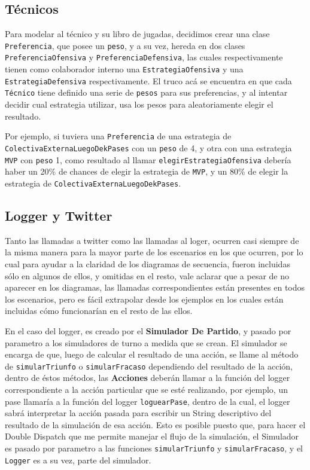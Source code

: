 \subsection{Técnicos}
Para modelar al técnico y su libro de jugadas, decidimos crear una clase \texttt{Preferencia}, que posee un \texttt{peso}, y a su vez, hereda en dos clases \texttt{PreferenciaOfensiva} y \texttt{PreferenciaDefensiva}, las cuales respectivamente tienen como colaborador interno una \texttt{EstrategiaOfensiva} y una \texttt{EstrategiaDefensiva} respectivamente. El truco acá se encuentra en que cada \texttt{Técnico} tiene definido una serie de \texttt{pesos} para sus preferencias, y al intentar decidir cual estrategia utilizar, usa los pesos para aleatoriamente elegir el resultado.

Por ejemplo, si tuviera una \texttt{Preferencia} de una estrategia de \texttt{ColectivaExternaLuegoDekPases} con un \texttt{peso} de 4, y  otra con una estrategia \texttt{MVP} con \texttt{peso} 1, como resultado al llamar \texttt{elegirEstrategiaOfensiva} debería haber un 20\% de chances de elegir la estrategia de \texttt{MVP}, y un 80\% de elegir la estrategia de \texttt{ColectivaExternaLuegoDekPases}.

\subsection{Logger y Twitter}
Tanto las llamadas a twitter como las llamadas al loger, ocurren casi siempre de la misma manera para la mayor parte de los escenarios en los que ocurren, por lo cual para ayudar a la claridad de los diagramas de secuencia, fueron incluidas sólo en algunos de ellos, y omitidas en el resto, vale aclarar que a pesar de no aparecer en los diagramas, las llamadas correspondientes están presentes en todos los escenarios, pero es fácil extrapolar desde los ejemplos en los cuales están incluidas cómo funcionarían en el resto de las ellos.

En el caso del logger, es creado por el \textbf{Simulador De Partido}, y pasado por parametro a los simuladores de turno a medida que se crean. El simulador se encarga de que, luego de calcular el resultado de una acción, se llame al método de \texttt{simularTriunfo} o \texttt{simularFracaso} dependiendo del resultado de la acción, dentro de éstos métodos, las \textbf{Acciones} deberán llamar a la función del logger correspondiente a la acción particular que se esté realizando, por ejemplo, un pase llamaría a la función del logger \texttt{loguearPase}, dentro de la cual, el logger sabrá interpretar la acción pasada para escribir un String descriptivo del resultado de la simulación de esa acción. Esto es posible puesto que, para hacer el Double Dispatch que me permite manejar el flujo de la simulación, el Simulador es pasado por parametro a las funciones \texttt{simularTriunfo} y \texttt{simularFracaso}, y el \texttt{Logger} es a su vez, parte del simulador.

